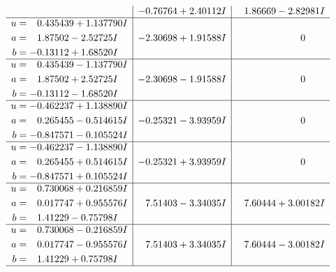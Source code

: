 \documentclass[1p]{elsarticle_modified}
\theoremstyle{definition}
\begin{document}
$$\begin{array}{c|c|c}
 & -0.76764 + 2.40112 I & \phantom{-}1.86669 - 2.82981 I \\ \hline\begin{aligned}
u &= \phantom{-}0.435439 + 1.137790 I \\
a &= \phantom{-}1.87502 - 2.52725 I \\
b &= -0.13112 + 1.68520 I\end{aligned}
 & -2.30698 + 1.91588 I & \phantom{-0.000000 } 0 \\ \hline\begin{aligned}
u &= \phantom{-}0.435439 - 1.137790 I \\
a &= \phantom{-}1.87502 + 2.52725 I \\
b &= -0.13112 - 1.68520 I\end{aligned}
 & -2.30698 - 1.91588 I & \phantom{-0.000000 } 0 \\ \hline\begin{aligned}
u &= -0.462237 + 1.138890 I \\
a &= \phantom{-}0.265455 - 0.514615 I \\
b &= -0.847571 - 0.105524 I\end{aligned}
 & -0.25321 - 3.93959 I & \phantom{-0.000000 } 0 \\ \hline\begin{aligned}
u &= -0.462237 - 1.138890 I \\
a &= \phantom{-}0.265455 + 0.514615 I \\
b &= -0.847571 + 0.105524 I\end{aligned}
 & -0.25321 + 3.93959 I & \phantom{-0.000000 } 0 \\ \hline\begin{aligned}
u &= \phantom{-}0.730068 + 0.216859 I \\
a &= \phantom{-}0.017747 + 0.955576 I \\
b &= \phantom{-}1.41229 - 0.75798 I\end{aligned}
 & \phantom{-}7.51403 - 3.34035 I & \phantom{-}7.60444 + 3.00182 I \\ \hline\begin{aligned}
u &= \phantom{-}0.730068 - 0.216859 I \\
a &= \phantom{-}0.017747 - 0.955576 I \\
b &= \phantom{-}1.41229 + 0.75798 I\end{aligned}
 & \phantom{-}7.51403 + 3.34035 I & \phantom{-}7.60444 - 3.00182 I\\
 \hline 
 \end{array}$$\newpage$$\begin{array}{c|c|c}  

\end{array}$$
\end{document}
